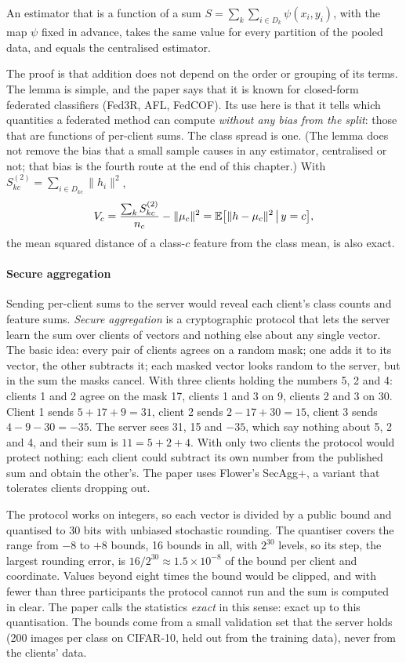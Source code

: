 \begin{lemma*}
An estimator that is a function of a sum $S=\sum_k\sum_{i\in D_k}\psi(x_i,y_i)$, with the map $\psi$ fixed in
advance, takes the same value for every partition of the pooled data, and equals the centralised estimator.
\end{lemma*}

The proof is that addition does not depend on the order or grouping of its terms. The lemma is simple, and the paper
says that it is known for closed-form federated classifiers (Fed3R, AFL, FedCOF). Its use here is that it tells which
quantities a federated method can compute \emph{without any bias from the split}: those that are functions of
per-client sums. The class spread is one. (The lemma does not remove the bias that a small sample causes in any
estimator, centralised or not; that bias is the fourth route at the end of this chapter.) With $S^{(2)}_{kc}=\sum_{i\in D_{kc}}\|h_i\|^2$,
\[
V_c=\frac{\sum_k S^{(2)}_{kc}}{n_c}-\|\mu_c\|^2=\mathbb{E}\big[\|h-\mu_c\|^2\,\big|\,y=c\big],
\]
the mean squared distance of a class-$c$ feature from the class mean, is also exact.

\paragraph{Secure aggregation} Sending per-client sums to the server would reveal each client's class counts and
feature sums. \emph{Secure aggregation} is a cryptographic protocol that lets the server learn the sum over clients of
vectors and nothing else about any single vector. The basic idea: every pair of clients agrees on a random mask; one
adds it to its vector, the other subtracts it; each masked vector looks random to the server, but in the sum the masks
cancel. With three clients holding the numbers 5, 2 and 4: clients 1 and 2 agree on the mask 17, clients 1 and 3 on
9, clients 2 and 3 on 30. Client 1 sends $5+17+9=31$, client 2 sends $2-17+30=15$, client 3 sends $4-9-30=-35$. The
server sees 31, 15 and $-35$, which say nothing about 5, 2 and 4, and their sum is $11=5+2+4$. With only two clients
the protocol would protect nothing: each client could subtract its own number from the published sum and obtain the
other's. The paper uses Flower's SecAgg+, a variant that tolerates clients dropping out.

The protocol works on integers, so each vector is divided by a public bound and quantised to 30 bits with unbiased
stochastic rounding. The quantiser covers the range from $-8$ to $+8$ bounds, 16 bounds in all, with $2^{30}$
levels, so its step, the largest rounding error, is $16/2^{30}\approx1.5\times10^{-8}$ of the bound per client and
coordinate. Values beyond eight times the bound would be clipped, and with fewer than three participants the protocol cannot run and the sum is
computed in clear. The paper calls the statistics \emph{exact} in this sense: exact up to this quantisation. The
bounds come from a small validation set that the server holds (200 images per class on CIFAR-10, held out from the
training data), never from the clients' data.


